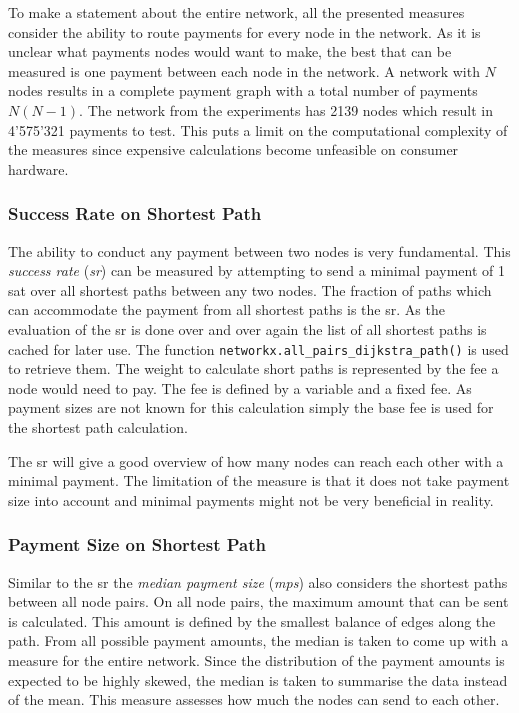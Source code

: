 \documentclass[final]{fhnwreport}       %
\begin{document}
To make a statement about the entire network, all the presented measures consider the ability to route payments for every node in the network. As it is unclear what payments nodes would want to make, the best that can be measured is one payment between each node in the network. A network with $N$ nodes results in a complete payment graph with a total number of payments $N(N-1)$. The network from the experiments has 2139 nodes which result in 4'575'321 payments to test. This puts a limit on the computational complexity of the measures since expensive calculations become unfeasible on consumer hardware.

\subsubsection{Success Rate on Shortest Path}
The ability to conduct any payment between two nodes is very fundamental. This \emph{success rate} (\emph{\gls{sr}}) can be measured by attempting to send a minimal payment of 1 sat over all shortest paths between any two nodes. The fraction of paths which can accommodate the payment from all shortest paths is the \gls{sr}. As the evaluation of the \gls{sr} is done over and over again the list of all shortest paths is cached for later use. The function \texttt{networkx.all_pairs_dijkstra_path()} is used to retrieve them. The weight to calculate short paths is represented by the fee a node would need to pay. The fee is defined by a variable and a fixed fee. As payment sizes are not known for this calculation simply the base fee is used for the shortest path calculation. 

The \gls{sr} will give a good overview of how many nodes can reach each other with a minimal payment. The limitation of the measure is that it does not take payment size into account and minimal payments might not be very beneficial in reality.


\subsubsection{Payment Size on Shortest Path}
Similar to the \gls{sr} the \emph{median payment size} (\emph{\gls{mps}}) also considers the shortest paths between all node pairs. On all node pairs, the maximum amount that can be sent is calculated. This amount is defined by the smallest balance of edges along the path. From all possible payment amounts, the median is taken to come up with a measure for the entire network. Since the distribution of the payment amounts is expected to be highly skewed, the median is taken to summarise the data instead of the mean. This measure assesses how much the nodes can send to each other.
\end{document}
